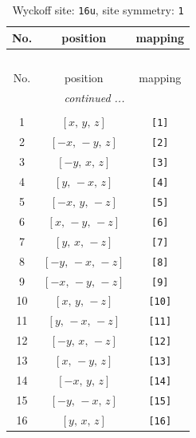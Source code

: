 \documentclass[fleqn,8pt]{jsarticle}
\begin{document}
\begin{longtable}{ccc}
\caption{Wyckoff site: {\tt 16u}, site symmetry: {\tt 1}}
 \\
 \hline \hline
No. & position & mapping \\ \hline \endfirsthead

\multicolumn{2}{l}{\tablename\ \thetable{}} \\
 \hline \hline
No. & position & mapping \\ \hline \endhead

 \hline \hline
\multicolumn{2}{r}{\footnotesize\it continued ...} \\ \endfoot

 \hline \hline
\multicolumn{2}{r}{} \\ \endlastfoot

1 & $\left[ x,\, y,\, z \right]$ & {\tt [1]} \\ \hline
2 & $\left[ - x,\, - y,\, z \right]$ & {\tt [2]} \\ \hline
3 & $\left[ - y,\, x,\, z \right]$ & {\tt [3]} \\ \hline
4 & $\left[ y,\, - x,\, z \right]$ & {\tt [4]} \\ \hline
5 & $\left[ - x,\, y,\, - z \right]$ & {\tt [5]} \\ \hline
6 & $\left[ x,\, - y,\, - z \right]$ & {\tt [6]} \\ \hline
7 & $\left[ y,\, x,\, - z \right]$ & {\tt [7]} \\ \hline
8 & $\left[ - y,\, - x,\, - z \right]$ & {\tt [8]} \\ \hline
9 & $\left[ - x,\, - y,\, - z \right]$ & {\tt [9]} \\ \hline
10 & $\left[ x,\, y,\, - z \right]$ & {\tt [10]} \\ \hline
11 & $\left[ y,\, - x,\, - z \right]$ & {\tt [11]} \\ \hline
12 & $\left[ - y,\, x,\, - z \right]$ & {\tt [12]} \\ \hline
13 & $\left[ x,\, - y,\, z \right]$ & {\tt [13]} \\ \hline
14 & $\left[ - x,\, y,\, z \right]$ & {\tt [14]} \\ \hline
15 & $\left[ - y,\, - x,\, z \right]$ & {\tt [15]} \\ \hline
16 & $\left[ y,\, x,\, z \right]$ & {\tt [16]} \\
\end{longtable}
\end{document}
